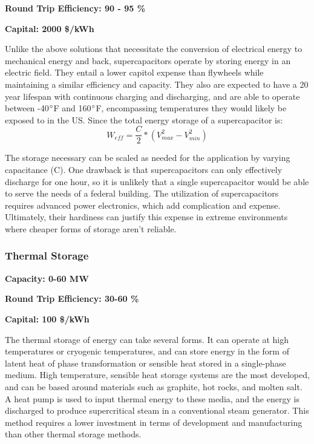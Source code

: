 \noindent\textbf{Round Trip Efficiency: 90 - 95 \%}

\noindent\textbf{Capital: 2000 \$/kWh}

Unlike the above solutions that necessitate the conversion of electrical energy
to mechanical energy and back, supercapacitors operate by storing energy in an
electric field. They entail a lower capitol expense than flywheels while
maintaining a similar efficiency and capacity. They also are expected to have a
20 year lifespan with continuous charging and discharging, and are able to
operate between -40$\degree$F and 160$\degree$F, encompassing temperatures they
would likely be exposed to in the US. Since the total energy storage of a supercapacitor is:
\begin{equation}
W_{eff}=\frac{C}{2}*(V^2_{max}-V^2_{min})
\end{equation}

The storage necessary can be scaled as needed for the application by varying
capacitance (C). One drawback is that supercapacitors can only effectively
discharge for one hour, so it is unlikely that a single supercapacitor would be
able to serve the needs of a federal building. The utilization of
supercapacitors requires advanced power electronics, which add complication and
expense. Ultimately, their hardiness can justify this expense in extreme
environments where cheaper forms of storage aren't reliable.


\subsubsection{Thermal Storage}
\textbf{Capacity: 0-60 MW}

\noindent\textbf{Round Trip Efficiency: 30-60 \%} 

\noindent\textbf{Capital: 100 \$/kWh}

The thermal storage of energy can take several forms. It can operate at high
temperatures or cryogenic temperatures, and can store energy in the form of
latent heat of phase transformation or sensible heat stored in a single-phase
medium. High temperature, sensible heat storage systems are the most developed,
and can be based around materials such as graphite, hot rocks, and molten salt.
A heat pump is used to input thermal energy to these media, and the energy is
discharged to produce supercritical steam in a conventional steam generator.
This method requires a lower investment in terms of development and
manufacturing than other thermal storage methods.
 
